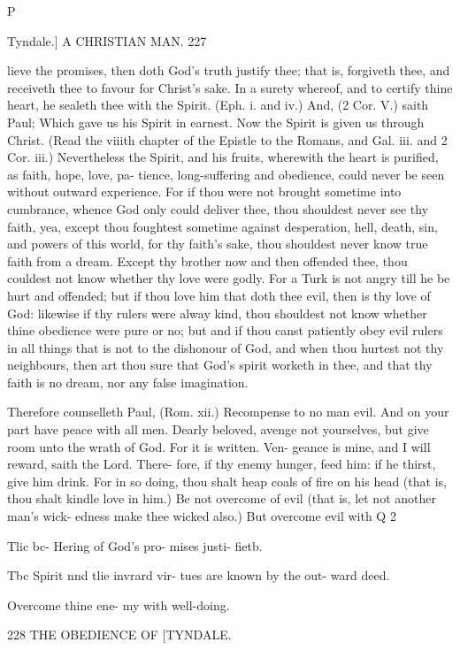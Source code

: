 \documentclass{custom}
\begin{document}
{P 


Tyndale.]
A CHRISTIAN MAN. 
227 

lieve the promises, then doth God's truth justify thee;
that is, forgiveth thee, and receiveth thee to favour for 
Christ's sake. In a surety whereof, and to certify thine 
heart, he sealeth thee with the Spirit. (Eph. i. and iv.) And, 
(2 Cor. V.) saith Paul; Which gave us his Spirit in earnest. 
Now the Spirit is given us through Christ. (Read the 
viiith chapter of the Epistle to the Romans, and Gal. iii. 
and 2 Cor. iii.) Nevertheless the Spirit, and his fruits, 
wherewith the heart is purified, as faith, hope, love, pa- 
tience, long-suffering and obedience, could never be 
seen without outward experience. For if thou were not 
brought sometime into cumbrance, whence God only 
could deliver thee, thou shouldest never see thy faith, yea, 
except thou foughtest sometime against desperation, hell, 
death, sin, and powers of this world, for thy faith's 
sake, thou shouldest never know true faith from a 
dream. Except thy brother now and then offended thee, 
thou couldest not know whether thy love were godly. 
For a Turk is not angry till he be hurt and offended;
but if thou love him that doth thee evil, then is thy 
love of God: likewise if thy rulers were alway kind, thou 
shouldest not know whether thine obedience were pure 
or no; but and if thou canst patiently obey evil rulers in 
all things that is not to the dishonour of God, and when 
thou hurtest not thy neighbours, then art thou sure that 
God's spirit worketh in thee, and that thy faith is no dream, 
nor any false imagination. 

Therefore counselleth Paul, (Rom. xii.) Recompense 
to no man evil. And on your part have peace with all 
men. Dearly beloved, avenge not yourselves, but give 
room unto the wrath of God. For it is written. Ven- 
geance is mine, and I will reward, saith the Lord. There- 
fore, if thy enemy hunger, feed him: if he thirst, give 
him drink. For in so doing, thou shalt heap coals of fire 
on his head (that is, thou shalt kindle love in him.) Be 
not overcome of evil (that is, let not another man's wick- 
edness make thee wicked also.) But overcome evil with 
Q 2 

Tlic bc- 
Hering of 
God's pro- 
mises justi- 
fietb. 

Tbc Spirit 
nnd tlie 
invrard vir- 
tues are 
known by 
the out- 
ward deed. 

Overcome 
thine ene- 
my with 
well-doing. 


228
THE OBEDIENCE OF 
[TYNDALE.

}
\end{document}
